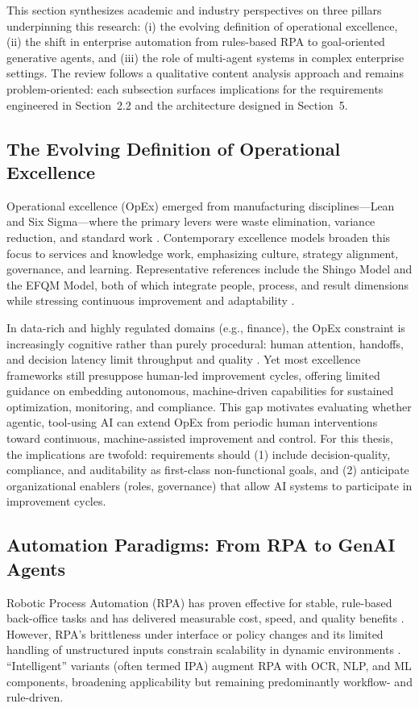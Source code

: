 This section synthesizes academic and industry perspectives on three pillars underpinning this research: (i) the evolving definition of operational excellence, (ii) the shift in enterprise automation from rules-based RPA to goal-oriented generative agents, and (iii) the role of multi-agent systems in complex enterprise settings. The review follows a qualitative content analysis approach \parencite{mayringQualitativeContentAnalysis2022} and remains problem-oriented: each subsection surfaces implications for the requirements engineered in Section~2.2 and the architecture designed in Section~5.

\subsection{The Evolving Definition of Operational Excellence}
Operational excellence (OpEx) emerged from manufacturing disciplines—Lean and Six Sigma—where the primary levers were waste elimination, variance reduction, and standard work \parencite{Womack1990,Harry1998}. Contemporary excellence models broaden this focus to services and knowledge work, emphasizing culture, strategy alignment, governance, and learning. Representative references include the Shingo Model and the EFQM Model, both of which integrate people, process, and result dimensions while stressing continuous improvement and adaptability \parencite{Shingo2014,EFQM2020}.

In data-rich and highly regulated domains (e.g., finance), the OpEx constraint is increasingly cognitive rather than purely procedural: human attention, handoffs, and decision latency limit throughput and quality \parencite{Hammer2004,Davenport2018}. Yet most excellence frameworks still presuppose human-led improvement cycles, offering limited guidance on embedding autonomous, machine-driven capabilities for sustained optimization, monitoring, and compliance. This gap motivates evaluating whether agentic, tool-using AI can extend OpEx from periodic human interventions toward continuous, machine-assisted improvement and control. For this thesis, the implications are twofold: requirements should (1) include decision-quality, compliance, and auditability as first-class non-functional goals, and (2) anticipate organizational enablers (roles, governance) that allow AI systems to participate in improvement cycles.
\subsection{Automation Paradigms: From RPA to GenAI Agents}
Robotic Process Automation (RPA) has proven effective for stable, rule-based back-office tasks and has delivered measurable cost, speed, and quality benefits \parencite{Lacity2016}. However, RPA’s brittleness under interface or policy changes and its limited handling of unstructured inputs constrain scalability in dynamic environments \parencite{Syed2021}. ``Intelligent'' variants (often termed IPA) augment RPA with OCR, NLP, and ML components, broadening applicability but remaining predominantly workflow- and rule-driven.

